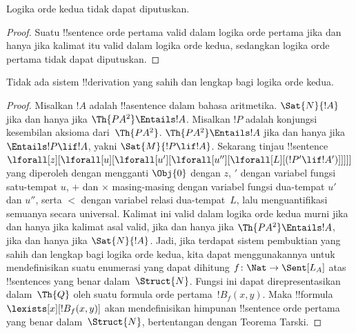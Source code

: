\documentclass[../../../include/open-logic-section]{subfiles}
\begin{document}



\begin{thm}
Logika orde kedua tidak dapat diputuskan.
\end{thm}

\begin{proof}
Suatu !!{sentence} orde pertama valid dalam logika orde pertama jika dan hanya
jika kalimat itu valid dalam logika orde kedua, sedangkan logika orde pertama
tidak dapat diputuskan.
\end{proof}

\begin{thm}
Tidak ada sistem !!{derivation} yang sahih dan lengkap bagi logika orde kedua.
\end{thm}

\begin{proof}
Misalkan $!A$ adalah !!a{sentence} dalam bahasa aritmetika. $\Sat{N}{!A}$
jika dan hanya jika $\Th{PA^2} \Entails !A$. Misalkan $!P$ adalah konjungsi
kesembilan aksioma dari~$\Th{PA^2}$. $\Th{PA^2} \Entails !A$ jika dan hanya
jika $\Entails !P \lif !A$, yakni $\Sat{M}{!P \lif !A}$. Sekarang tinjau
!!{sentence}
$\lforall[z][\lforall[u][\lforall[u'][\lforall[u''][\lforall[L][(!P' \lif !A')]]]]]$
yang diperoleh dengan mengganti $\Obj{0}$ dengan $z$, $\prime$ dengan
variabel fungsi satu-tempat $u$, $+$ dan $\times$ masing-masing dengan
variabel fungsi dua-tempat $u'$ dan $u''$, serta $<$ dengan variabel relasi
dua-tempat~$L$, lalu menguantifikasi semuanya secara universal. Kalimat ini
valid dalam logika orde kedua murni jika dan hanya jika kalimat asal valid,
jika dan hanya jika $\Th{PA^2} \Entails !A$, jika dan hanya jika
$\Sat{N}{!A}$. Jadi, jika terdapat sistem pembuktian yang sahih dan lengkap
bagi logika orde kedua, kita dapat menggunakannya untuk mendefinisikan suatu
enumerasi yang dapat dihitung $f\colon \Nat \to \Sent[L_A]$ atas
!!{sentence}s yang benar dalam~$\Struct{N}$. Fungsi ini dapat
direpresentasikan dalam~$\Th{Q}$ oleh suatu formula orde pertama~$!B_f(x,
y)$. Maka !!{formula}~$\lexists[x][!B_f(x, y)]$ akan mendefinisikan himpunan
!!{sentence} orde pertama yang benar dalam~$\Struct{N}$, bertentangan dengan
Teorema Tarski.
\end{proof}
\end{document}
